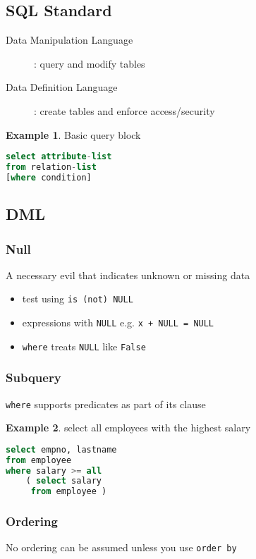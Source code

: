 \documentclass[]{article}
\theoremstyle{definition}
\newtheorem{ex}{Example}[section]
\begin{document}
		\subsection{SQL Standard}
			\begin{description}
				\item[Data Manipulation Language]: query and modify tables
				\item[Data Definition Language]: create tables and enforce access/security
			\end{description}				
			\begin{ex}
				Basic query block
				\begin{lstlisting}[language=SQL]
select attribute-list
from relation-list
[where condition]
				\end{lstlisting}
			\end{ex}			
		\subsection{DML}
			\subsubsection{Null}
				A necessary evil that indicates unknown or missing data
				\begin{itemize}
					\item test using \lstinline|is (not) NULL|
					\item expressions with \lstinline|NULL| e.g. \lstinline|x + NULL = NULL|
					\item \lstinline|where| treats \lstinline|NULL| like \lstinline|False|
				\end{itemize}
			\subsubsection{Subquery}
				\lstinline|where| supports predicates as part of its clause
				\begin{ex} select all employees with the highest salary
					\begin{lstlisting}[language=SQL]
select empno, lastname
from employee
where salary >= all
 	( select salary
	 from employee )				
					\end{lstlisting}
				\end{ex}
			\subsubsection{Ordering}
				No ordering can be assumed unless you use \lstinline|order by|
\end{document}
